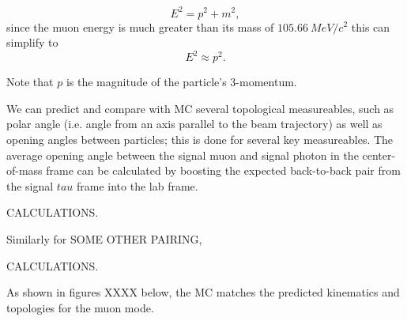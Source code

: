 \documentclass[12pt]{thesis}  %
\begin{document}
\begin{equation}
E^2 = p^2 + m^2,
\end{equation}
since the muon energy is much greater than its mass of $\SI{105.66}{MeV/c^2}$ this can simplify to
\begin{equation}
E^2 \approx p^2.
\end{equation}

Note that $p$ is the magnitude of the particle's 3-momentum.

We can predict and compare with MC several topological measureables, such as polar angle (i.e. angle from an axis parallel to the beam trajectory) as well as opening angles between particles; this is done for several key measureables. The average opening angle between the signal muon and signal photon in the center-of-mass frame can be calculated by boosting the expected back-to-back pair from the signal $tau$ frame into the lab frame.

CALCULATIONS.

Similarly for SOME OTHER PAIRING,

CALCULATIONS.

As shown in figures XXXX below, the MC matches the predicted kinematics and topologies for the muon mode.
\end{document}
